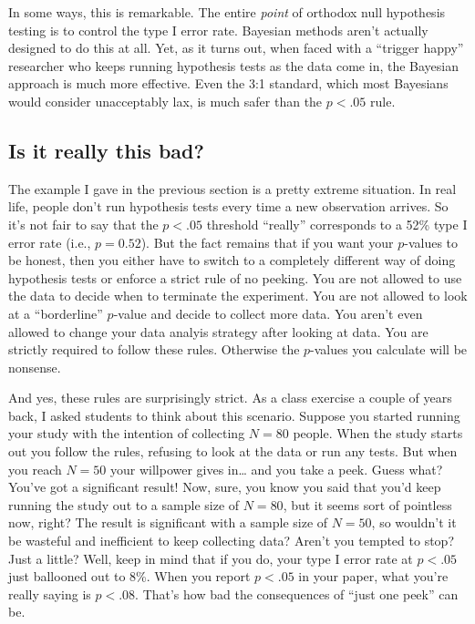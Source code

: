 \documentclass[
  a4paper,
]{book}
\begin{document}
In some ways, this is remarkable. The entire \emph{point} of orthodox
null hypothesis testing is to control the type I error rate. Bayesian
methods aren't actually designed to do this at all. Yet, as it turns
out, when faced with a ``trigger happy'' researcher who keeps running
hypothesis tests as the data come in, the Bayesian approach is much more
effective. Even the 3:1 standard, which most Bayesians would consider
unacceptably lax, is much safer than the \(p < .05\) rule.

\hypertarget{is-it-really-this-bad}{%
\subsection{Is it really this bad?}\label{is-it-really-this-bad}}

The example I gave in the previous section is a pretty extreme
situation. In real life, people don't run hypothesis tests every time a
new observation arrives. So it's not fair to say that the \(p < .05\)
threshold ``really'' corresponds to a 52\% type I error rate (i.e.,
\(p = 0.52\)). But the fact remains that if you want your \(p\)-values
to be honest, then you either have to switch to a completely different
way of doing hypothesis tests or enforce a strict rule of no peeking.
You are not allowed to use the data to decide when to terminate the
experiment. You are not allowed to look at a ``borderline'' \(p\)-value
and decide to collect more data. You aren't even allowed to change your
data analyis strategy after looking at data. You are strictly required
to follow these rules. Otherwise the \(p\)-values you calculate will be
nonsense.

And yes, these rules are surprisingly strict. As a class exercise a
couple of years back, I asked students to think about this scenario.
Suppose you started running your study with the intention of collecting
\(N = 80\) people. When the study starts out you follow the rules,
refusing to look at the data or run any tests. But when you reach
\(N = 50\) your willpower gives in\ldots{} and you take a peek. Guess
what? You've got a significant result! Now, sure, you know you said that
you'd keep running the study out to a sample size of \(N = 80\), but it
seems sort of pointless now, right? The result is significant with a
sample size of \(N = 50\), so wouldn't it be wasteful and inefficient to
keep collecting data? Aren't you tempted to stop? Just a little? Well,
keep in mind that if you do, your type I error rate at \(p < .05\) just
ballooned out to 8\%. When you report \(p < .05\) in your paper, what
you're really saying is \(p < .08\). That's how bad the consequences of
``just one peek'' can be.
\end{document}
